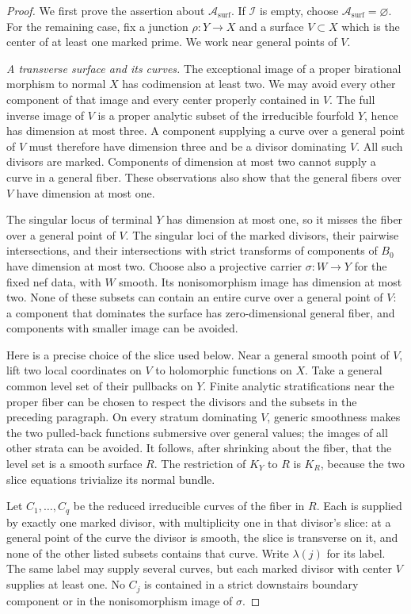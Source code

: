 \documentclass[11pt]{amsart}
\theoremstyle{definition}
\theoremstyle{remark}
\numberwithin{equation}{section}
\begin{document}
\begin{proof}
We first prove the assertion about $\mathcal A_{\mathrm{surf}}$.  If
$\mathcal I$ is empty, choose $\mathcal A_{\mathrm{surf}}=\varnothing$.
For the remaining case, fix a junction $\rho:Y\to X$ and a surface
$V\subset X$ which is the center of at least one marked prime.  We work
near general points of $V$.

\medskip\noindent\emph{A transverse surface and its curves.}
The exceptional image of a proper birational morphism to normal $X$ has
codimension at least two.  We may avoid every other component of that
image and every center properly contained in $V$.  The full inverse image
of $V$ is a proper analytic subset of the irreducible fourfold $Y$, hence
has dimension at most three.  A component supplying a curve over a general
point of $V$ must therefore have dimension three and be a divisor
dominating $V$.  All such divisors are marked.  Components of dimension
at most two cannot supply a curve in a general fiber.  These observations
also show that the general fibers over $V$ have dimension at most one.

The singular locus of terminal $Y$ has dimension at most one, so it misses
the fiber over a general point of $V$.  The singular loci of the marked
divisors, their pairwise intersections, and their intersections with
strict transforms of components of $B_0$ have dimension at most two.
Choose also a projective carrier $\sigma:W\to Y$ for the fixed nef data,
with $W$ smooth.  Its nonisomorphism image has dimension at most two.  None of
these subsets can contain an entire curve over a general point of $V$:
a component that dominates the surface has zero-dimensional general
fiber, and components with smaller image can be avoided.

Here is a precise choice of the slice used below.  Near a general smooth
point of $V$, lift two local coordinates on $V$ to holomorphic functions
on $X$.  Take a general common level set of their pullbacks on $Y$.
Finite analytic stratifications near the proper fiber can be chosen to
respect the divisors and the subsets in the preceding paragraph.  On
every stratum dominating $V$, generic smoothness makes the two pulled-back
functions submersive over general values; the images of all other strata
can be avoided.  It follows, after shrinking about the fiber, that the
level set is a smooth surface $R$.  The restriction of $K_Y$ to $R$ is
$K_R$, because the two slice equations trivialize its normal bundle.

Let $C_1,\ldots,C_q$ be the reduced irreducible curves of the fiber in
$R$.  Each is supplied by exactly one marked divisor, with multiplicity
one in that divisor's slice: at a general point of the curve the divisor
is smooth, the slice is transverse on it, and none of the other listed
subsets contains that curve.  Write $\lambda(j)$ for its label.  The same
label may supply several curves, but each marked divisor with center $V$
supplies at least one.  No $C_j$ is contained in a strict downstairs
boundary component or in the nonisomorphism image of $\sigma$.


\end{proof}
\end{document}
